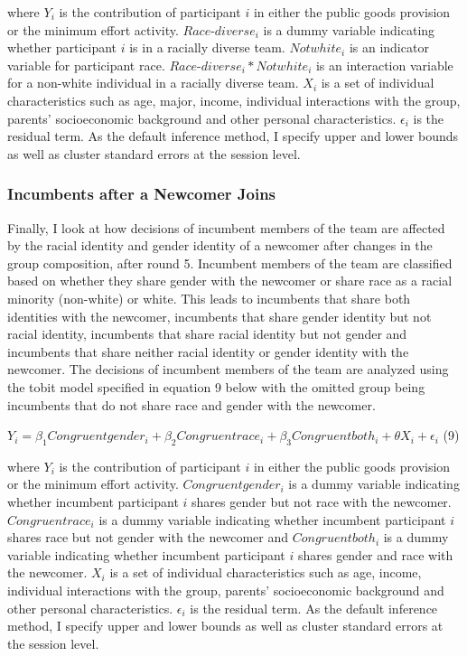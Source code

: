 \noindent where $Y_{i}$ is the contribution of participant $i$ in either the public goods provision or the minimum effort activity. $Race$-$diverse_{i}$ is a dummy variable indicating whether participant $i$ is in a racially diverse team. $Notwhite_{i}$ is an indicator variable for participant race. $Race$-$diverse_{i}*Notwhite_{i}$ is an interaction variable for a non-white individual in a racially diverse team. $X_{i}$ is a set of individual characteristics such as age, major, income, individual interactions with the group, parents' socioeconomic background and other personal characteristics. $\epsilon_{i}$ is the residual term. As the default inference method, I specify upper and lower bounds as well as cluster standard errors at the session level.


\subsubsection{Incumbents after a Newcomer Joins}

Finally, I look at how decisions of incumbent members of the team are affected by the racial identity and gender identity of a newcomer after changes in the group composition, after round 5. Incumbent members of the team are classified based on whether they share gender with the newcomer or share race as a racial minority (non-white) or white. This leads to incumbents that share both identities with the newcomer, incumbents that share gender identity but not racial identity, incumbents that share racial identity but not gender and incumbents that share neither racial identity or gender identity with the newcomer. The decisions of incumbent members of the team are analyzed using the tobit model specified in equation 9 below with the omitted group being incumbents that do not share race and gender with the newcomer.  

\begin{center}
 $ Y_{i} = \beta_1 Congruentgender_{i} +\beta_2 Congruentrace_{i} + \beta_3 Congruentboth_{i} + \theta X_{i} + \epsilon_{i}  $  \space \space \space    (9)
\end{center}

\noindent where $Y_{i}$ is the contribution of participant $i$ in either the public goods provision or the minimum effort activity.  $Congruentgender_{i}$ is a dummy variable indicating whether incumbent participant $i$ shares gender but not race with the newcomer. $Congruentrace_{i}$ is a dummy variable indicating whether incumbent participant $i$ shares race but not gender with the newcomer and $Congruentboth_{i}$  is a dummy variable indicating whether incumbent participant $i$ shares gender and race with the newcomer. $X_{i}$ is a set of individual characteristics such as age, income, individual interactions with the group, parents' socioeconomic background and other personal characteristics. $\epsilon_{i}$ is the residual term. As the default inference method, I specify upper and lower bounds as well as cluster standard errors at the session level.

